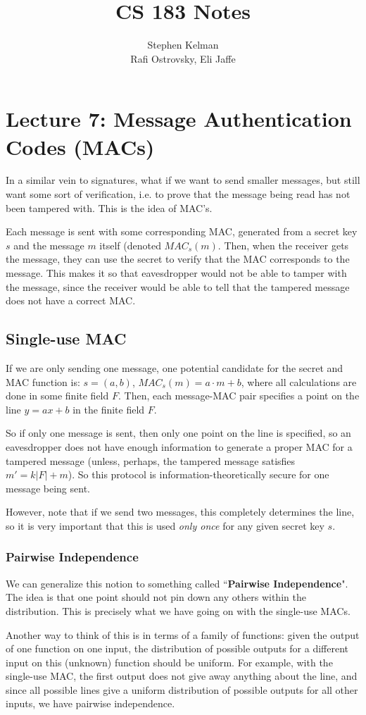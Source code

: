 \documentclass[11pt]{article}
\title{CS 183 Notes}
\author{Stephen Kelman\\ Rafi Ostrovsky, Eli Jaffe}
\begin{document}
\section{Lecture 7: Message Authentication Codes (MACs)}
In a similar vein to signatures, what if we want to send smaller messages, but still want some sort of verification, i.e. to prove that the message being read has not been tampered with. This is the idea of MAC's. \smallskip

Each message is sent with some corresponding MAC, generated from a secret key \(s\) and the message \(m\) itself (denoted \(MAC_s(m)\). Then, when the receiver gets the message, they can use the secret to verify that the MAC corresponds to the message. This makes it so that eavesdropper would not be able to tamper with the message, since the receiver would be able to tell that the tampered message does not have a correct MAC.

\subsection{Single-use MAC}
If we are only sending one message, one potential candidate for the secret and MAC function is: \(s = (a,b)\), \(MAC_s(m) = a\cdot m+b\), where all calculations are done in some finite field \(F\). Then, each message-MAC pair specifies a point on the line \(y=ax+b\) in the finite field \(F\). \smallskip

So if only one message is sent, then only one point on the line is specified, so an eavesdropper does not have enough information to generate a proper MAC for a tampered message (unless, perhaps, the tampered message satisfies \(m'=k|F|+m\)). So this protocol is information-theoretically secure for one message being sent.\smallskip

However, note that if we send two messages, this completely determines the line, so it is very important that this is used \emph{only once} for any given secret key \(s\).\bigskip

\subsubsection{Pairwise Independence}
We can generalize this notion to something called ``\textbf{Pairwise Independence}". The idea is that one point should not pin down any others within the distribution. This is precisely what we have going on with the single-use MACs. \smallskip

Another way to think of this is in terms of a family of functions: given the output of one function on one input, the distribution of possible outputs for a different input on this (unknown) function should be uniform. For example, with the single-use MAC, the first output does not give away anything about the line, and since all possible lines give a uniform distribution of possible outputs for all other inputs, we have pairwise independence.\smallskip
\end{document}
